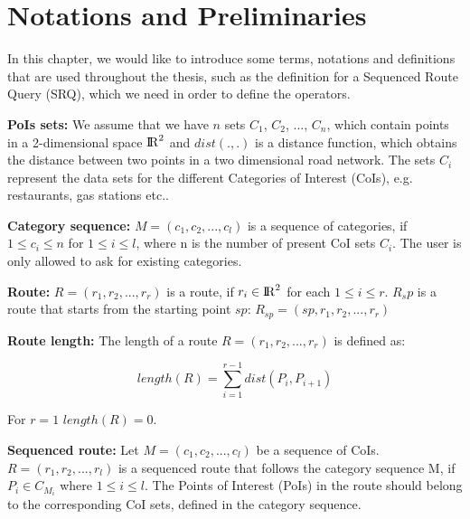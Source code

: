\chapter{Notations and Preliminaries} 
\label{sec:notes}
In this chapter, we would like to introduce some terms, notations and definitions that are used throughout the thesis, such as the definition for a Sequenced Route Query (SRQ), which we need in order to define the operators. \newline

\textbf{PoIs sets:} We assume that we have $n$ sets $C_1$, $C_2$, ..., $C_n$, which contain points in a 2-dimensional space ${\rm I\!R}^2$ and $dist(., .)$ is a distance function, which obtains the distance between two points in a two dimensional road network. The sets $C_i$ represent the data sets for the different Categories of Interest (CoIs), e.g. restaurants, gas stations etc.. \newline

\textbf{Category sequence:} $M = (c_1, c_2, ..., c_l)$ is a sequence of categories, if $1 \leq c_i \leq n$ for $1 \leq i \leq l$, where n is the number of present CoI sets $C_i$. The user is only allowed to ask for existing categories. \newline

\textbf{Route:} $R =(r_1, r_2, ..., r_r)$ is a route, if $r_i \in {\rm I\!R}^2$ for each $1 \leq i \leq r$. $R_sp$ is a route that starts from the starting point $sp$: $R_{sp} = (sp, r_1, r_2, ..., r_r)$\newline

\textbf{Route length:} The length of a route $R = (r_1, r_2, ..., r_r)$ is defined as:

\begin{equation}
length(R) = \sum_{i=1}^{r-1} dist(P_i, P_{i+1})
\end{equation}

For $r = 1$ $length(R) = 0$.
\newline

\textbf{Sequenced route:} Let $M = (c_1, c_2, ..., c_l)$ be a sequence of CoIs. $R = (r_1, r_2, ..., r_l)$ is a sequenced route that follows the category sequence M, if $P_i \in C_{M_i}$ where $1 \leq i \leq l$. The Points of Interest (PoIs) in the route should belong to the corresponding CoI sets, defined in the category sequence. \newline

